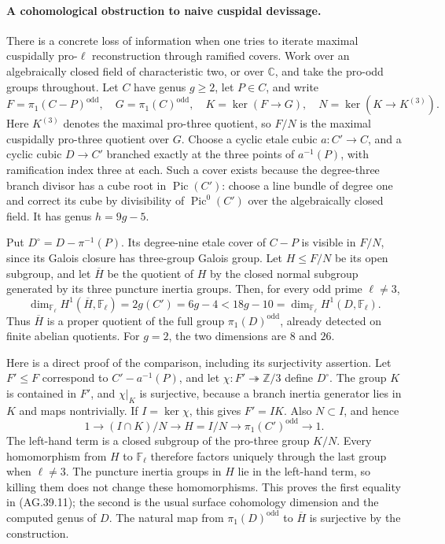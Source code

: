 \paragraph{A cohomological obstruction to naive cuspidal devissage.}
There is a concrete loss of information when one tries to
iterate maximal cuspidally pro-\(\ell\) reconstruction through
ramified covers. Work over an algebraically closed field of
characteristic two, or over \(\mathbb C\), and take the
pro-odd groups throughout. Let \(C\) have genus \(g\geq2\),
let \(P\in C\), and write
\[
 F=\pi_1(C-P)^{\mathrm{odd}},\quad
 G=\pi_1(C)^{\mathrm{odd}},\quad K=\ker(F\to G),
 \quad N=\ker(K\to K^{(3)}).
\]
Here \(K^{(3)}\) denotes the maximal pro-three quotient,
so \(F/N\) is the maximal cuspidally pro-three quotient over
\(G\). Choose a cyclic etale cubic \(a:C'\to C\), and a
cyclic cubic \(D\to C'\) branched exactly at the three
points of \(a^{-1}(P)\), with ramification index three at
each. Such a cover exists because the degree-three branch
divisor has a cube root in \(\operatorname{Pic}(C')\):
choose a line bundle of degree one and correct its cube
by divisibility of \(\operatorname{Pic}^0(C')\) over the
algebraically closed field.
It has genus \(h=9g-5\).

Put \(D^\circ=D-\pi^{-1}(P)\). Its degree-nine etale cover
of \(C-P\) is visible in \(F/N\), since its Galois closure
has three-group Galois group. Let \(H\leq F/N\) be its
open subgroup, and let \(\overline H\) be the quotient of
\(H\) by the closed normal subgroup generated by its three
puncture inertia groups. Then, for every odd prime
\(\ell\ne3\),
\[
 \dim_{\mathbb F_\ell}H^1(\overline H,\mathbb F_\ell)
       =2g(C')=6g-4
       <18g-10
       =\dim_{\mathbb F_\ell}H^1(D,\mathbb F_\ell).
                                                               \tag{AG.39.11}
\]
Thus \(\overline H\) is a proper quotient of the full
group \(\pi_1(D)^{\mathrm{odd}}\), already detected on
finite abelian quotients. For \(g=2\), the two dimensions
are \(8\) and \(26\).

Here is a direct proof of the comparison, including its
surjectivity assertion. Let \(F'\leq F\) correspond to
\(C'-a^{-1}(P)\), and let
\(\chi:F'\twoheadrightarrow\mathbb Z/3\) define
\(D^\circ\). The group \(K\) is contained in \(F'\),
and \(\chi|_K\) is surjective, because a branch inertia
generator lies in \(K\) and maps nontrivially. If
\(I=\ker\chi\), this gives \(F'=IK\). Also \(N\subset I\),
and hence
\[
 1\longrightarrow (I\cap K)/N\longrightarrow
 H=I/N\longrightarrow \pi_1(C')^{\mathrm{odd}}
 \longrightarrow1.                                  \tag{AG.39.12}
\]
The left-hand term is a closed subgroup of the pro-three
group \(K/N\). Every homomorphism from \(H\) to
\(\mathbb F_\ell\) therefore factors uniquely through
the last group when \(\ell\ne3\). The puncture inertia
groups in \(H\) lie in the left-hand term, so killing them
does not change these homomorphisms. This proves the first
equality in (AG.39.11); the second is the usual surface
cohomology dimension and the computed genus of \(D\).
The natural map from \(\pi_1(D)^{\mathrm{odd}}\) to
\(\overline H\) is surjective by the construction.

